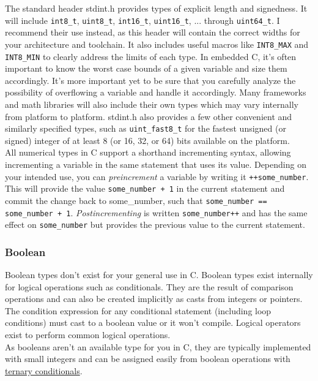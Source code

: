 \documentclass[10pt]{article}
\begin{document}
The standard header stdint.h provides types of explicit length and signedness. It will include \texttt{int8\_t}, \texttt{uint8\_t}, \texttt{int16\_t}, \texttt{uint16\_t}, ... through \texttt{uint64\_t}. I recommend their use instead, as this header will contain the correct widths for your architecture and toolchain. It also includes useful macros like \texttt{INT8\_MAX} and \texttt{INT8\_MIN} to clearly address the limits of each type. In embedded C, it’s often important to know the worst case bounds of a given variable and size them accordingly. It's more important yet to be sure that you carefully analyze the possibility of overflowing a variable and handle it accordingly. Many frameworks and math libraries will also include their own types which may vary internally from platform to platform. stdint.h also provides a few other convenient and similarly specified types, such as \texttt{uint\_fast8\_t} for the fastest unsigned (or signed) integer of at least 8 (or 16, 32, or 64) bits available on the platform. \\

All numerical types in C support a shorthand incrementing syntax, allowing incrementing a variable in the same statement that uses its value. Depending on your intended use, you can \textit{preincrement} a variable by writing it \texttt{++some\_number}. This will provide the value \texttt{some\_number + 1} in the current statement and commit the change back to some\_number, such that \texttt{some\_number == some\_number + 1}. \textit{Postincrementing} is written \texttt{some\_number++} and has the same effect on \texttt{some\_number} but provides the previous value to the current statement. \\

\subsubsection{Boolean}
Boolean types don't exist for your general use in C. Boolean types exist internally for logical operations such as conditionals. They are the result of comparison operations and can also be created implicitly as casts from integers or pointers. The condition expression for any conditional statement (including loop conditions) must cast to a boolean value or it won't compile. Logical operators exist to perform common logical operations. \\

As booleans aren't an available type for you in C, they are typically implemented with small integers and can be assigned easily from boolean operations with \hyperref[sec:ternary-conditionals]{ternary conditionals}.
\end{document}
